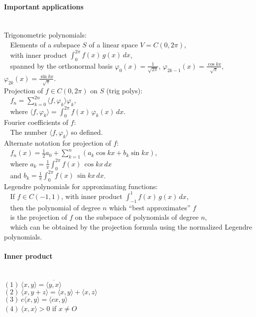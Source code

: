 \documentclass[10pt]{article}
\begin{document}
\paragraph{Important applications}\ \\
Trigonometric polynomials:\\
$\phantom{x}$ Elements of a subspace $S$ of a linear space $V = C(0, 2\pi)$,\\
$\phantom{x}$ with inner product $\int_0^{2\pi} f(x)\, g(x)\, dx$,\\
$\phantom{x}$ spanned by the orthonormal basis $\varphi_0(x) = \frac{1}{\sqrt{2\pi}}$,
$\varphi_{2k-1}(x) = \frac{\cos kx}{\sqrt{\pi}}$, $\varphi_{2k}(x) = \frac{\sin kx}{\sqrt{\pi}}$.\\
Projection of $f \in C(0, 2\pi)$ on $S$ (trig polys):\\
$\phantom{x}$ $f_n = \sum_{k=0}^{2n} \langle f, \varphi_k \rangle \varphi_k$,\\
$\phantom{x}$ where $\langle f, \varphi_k \rangle = \int_0^{2\pi} f(x)\, \varphi_k(x)\, dx$.\\
Fourier coefficients of $f$:\\
$\phantom{x}$ The number $\langle f, \varphi_k \rangle$ so defined.\\
Alternate notation for projection of $f$:\\
$\phantom{x}$ $f_n(x) = \frac{1}{2} a_0 + \sum_{k=1}^n (a_k \cos kx + b_k \sin kx)$,\\
$\phantom{x}$ where $a_k = \frac{1}{\pi} \int_0^{2\pi} f(x)\, \cos kx\, dx$\\
$\phantom{x}$ and $b_k = \frac{1}{\pi} \int_0^{2\pi} f(x)\, \sin kx\, dx$.\\
Legendre polynomials for approximating functions:\\
$\phantom{x}$ If $f \in C(-1, 1)$, with inner product $\int_{-1}^1 f(x)\, g(x)\, dx$,\\
$\phantom{x}$ then the polynomial of degree $n$ which ``best approximates'' $f$\\
$\phantom{x}$ is the projection of $f$ on the subspace of polynomials of degree $n$,\\
$\phantom{x}$ which can be obtained by the projection formula using the normalized Legendre polynomials.

\paragraph{Inner product}\ \\
$(1)\ \langle x,y\rangle =\overline{\langle y,x\rangle }$\\
$(2)\ \langle x, y+z\rangle  = \langle x,y\rangle  + \langle x, z\rangle $\\
$(3)\ c\langle x,y\rangle =\langle cx,y\rangle $\\
$(4)\ \langle x,x\rangle  > 0$ if $x \neq O$
\end{document}
